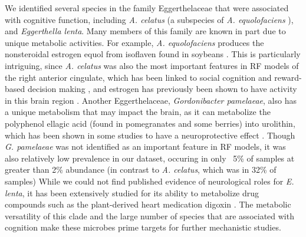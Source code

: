 \documentclass{article}
\begin{document}
We identified several species in the family Eggerthelaceae that were
associated with cognitive function, including \emph{A. celatus}
(a subspecies of \emph{A. equolofaciens}
\cite{takahashiCompleteGenomeSequence2021}),
and \emph{Eggerthella lenta}. Many members of this family are
known in part due to unique metabolic activities. For example, \emph{A.
equolofaciens} produces the nonsteroidal estrogen equol from isoflaven
found in soybeans \cite{wangEnantioselectiveSynthesisSEquol2005}.
This is particularly intriguing, since \emph{A. celatus}
was also the most important features in RF models of the
right anterior cingulate, which has been linked to social cognition
and reward-based decision making \cite{appsAnteriorCingulateGyrus2016,boesRightAnteriorCingulate2008,bushDorsalAnteriorCingulate2002},
and estrogen has previously been shown to have activity 
in this brain region \cite{xiaoEstrogenAnteriorCingulate2013}.
Another Eggerthelaceae, \emph{Gordonibacter pamelaeae},
also has a unique metabolism that may impact the brain,
as it can metabolize the polyphenol ellagic acid
(found in pomegranates and some berries) into urolithin, which has been
shown in some studies to have a neuroprotective effect
\cite{gongUrolithinAlleviatesBloodbrain2022,selmaDescriptionUrolithinProduction2014}.
Though \textit{G. pamelaeae} was not identified
as an important feature in RF models,
it was also relatively low prevalence in our dataset,
occuring in only ~5\% of samples at greater than 2\% abundance
(in contrast to \textit{A. celatus}, which was in 32\% of samples)
While we could not find published evidence of neurological roles for \emph{E. lenta},
it has been extensively studied for
its ability to metabolize drug compounds such as the plant-derived heart
medication digoxin \cite{haiserPredictingManipulatingCardiac2013}.
The metabolic versatility of this clade and the large number of
species that are associated with cognition make these microbes prime
targets for further mechanistic studies.
\end{document}
